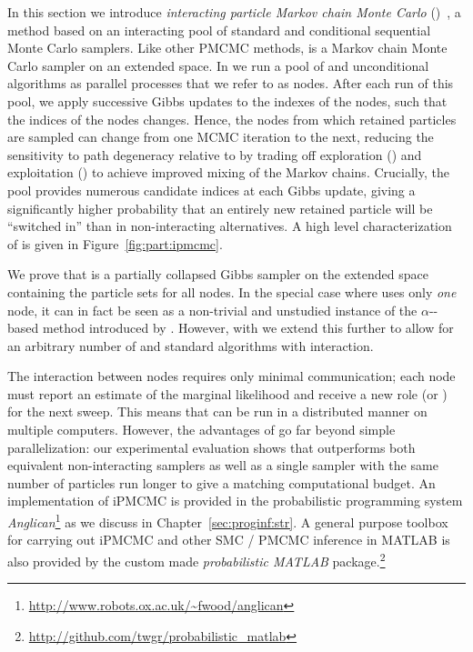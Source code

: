 
In this section we introduce \emph{interacting particle Markov chain Monte Carlo} (\ipmcmc)~\citep{rainforth2016interacting},
a \pmcmc method based on an interacting pool of standard and conditional sequential Monte Carlo samplers. Like 
other PMCMC methods, \ipmcmc is a Markov chain Monte Carlo sampler on an extended space. In \ipmcmc we run a pool of 
\csmc and unconditional \smc algorithms as parallel processes that we refer to as nodes. After each run of this pool, 
we apply successive Gibbs updates to the indexes of the \csmc nodes, such that the indices of the \csmc nodes changes. 
Hence, the nodes from which retained particles are sampled can change from one MCMC iteration to the next, reducing
the sensitivity to path degeneracy relative to \pg 
by trading off exploration (\smc) and exploitation (\csmc) to achieve improved mixing of the Markov chains. Crucially, 
the pool provides numerous candidate indices at each Gibbs update, giving a significantly higher probability that an 
entirely new retained particle will be ``switched in'' than in non-interacting alternatives.  A high level characterization
of \ipmcmc is given in Figure~\ref{fig:part:ipmcmc}.

We prove that \ipmcmc is a partially collapsed Gibbs sampler on the extended space containing the particle sets for all nodes. 
In the special case where \ipmcmc uses only \emph{one} \csmc node, it can in fact be seen as a non-trivial and unstudied 
instance of the $\alpha$-\smc-based \citep{whiteley2016} \pmcmc method introduced by \citet{huggins2015}. 
However, with \ipmcmc we extend this further to allow for an arbitrary number of \csmc and standard \smc algorithms 
with interaction.

The interaction between nodes requires only minimal communication; each node must report an estimate of the marginal likelihood 
and receive a new role (\smc or \csmc) for the next sweep. This means that \ipmcmc 
can be run in a distributed manner on multiple computers.  However, the advantages of \ipmcmc go far beyond
simple parallelization: our experimental evaluation shows that \ipmcmc outperforms both equivalent
non-interacting \pmcmc samplers as well as a single \pg sampler with the same number of particles run longer
to give a matching computational budget.
An implementation of iPMCMC is provided in the probabilistic programming system
\emph{Anglican}\footnote{\scriptsize \url{http://www.robots.ox.ac.uk/~fwood/anglican}} \citep{wood2014new} as we discuss in Chapter~\ref{sec:proginf:str}.  A general 
purpose toolbox for carrying out iPMCMC and other SMC / PMCMC inference in MATLAB is also provided by the custom
made \emph{probabilistic MATLAB} package.\footnote{\scriptsize \url{http://github.com/twgr/probabilistic_matlab}}

